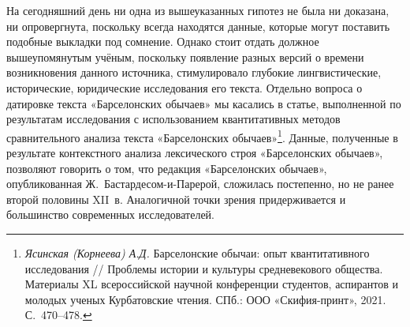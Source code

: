 На сегодняшний день ни одна из вышеуказанных гипотез не была ни доказана, ни опровергнута, поскольку всегда находятся данные, которые могут поставить подобные выкладки под сомнение. Однако стоит отдать должное вышеупомянутым учёным, поскольку появление разных версий о времени возникновения данного источника, стимулировало глубокие лингвистические, исторические, юридические исследования его текста. Отдельно вопроса о датировке текста «Барселонских обычаев» мы касались в статье, выполненной по результатам исследования с использованием квантитативных методов сравнительного анализа текста «Барселонских обычаев»\footnote{\emph{Ясинская (Корнеева) А.Д. }Барселонские обычаи: опыт квантитативного исследования // Проблемы истории и культуры средневекового общества. Материалы XL всероссийской научной конференции студентов, аспирантов и молодых ученых Курбатовские чтения. СПб.: ООО «Скифия-принт», 2021. С.~470--478.}. Данные, полученные в результате контекстного анализа лексического строя «Барселонских обычаев», позволяют говорить о том, что редакция «Барселонских обычаев», опубликованная Ж.~Бастардесом-и-Парерой, сложилась постепенно, но не ранее второй половины XII~в. Аналогичной точки зрения придерживается и большинство современных исследователей.

